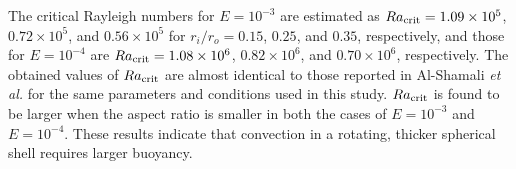 


The critical Rayleigh numbers 
{\color{blue} for $E = 10^{-3}$}
are estimated as $Ra_{\rm crit} = 1.09 \times 10^5$, $0.72 \times 10^5$, and $0.56 \times 10^5$ for $r_i/r_o = 0.15$, $0.25$, and $0.35$, respectively, 
{\color{blue} and those for $E = 10^{-4}$ are $Ra_{\rm crit} = 1.08 \times 10^6$, $0.82 \times 10^6$, and $0.70 \times 10^6$, respectively.
}
The obtained values of $Ra_{\rm crit}$ are almost identical to those reported in Al-Shamali {\it et al.}  for the same parameters and conditions used in this study. 
{\color{red} %
$Ra_{\rm crit}$ is found to be larger when the aspect ratio is smaller in both the cases of $E = 10^{-3}$ and $E = 10^{-4}$. 
These results indicate that convection in a rotating, thicker spherical shell requires larger buoyancy.
}
%
%


